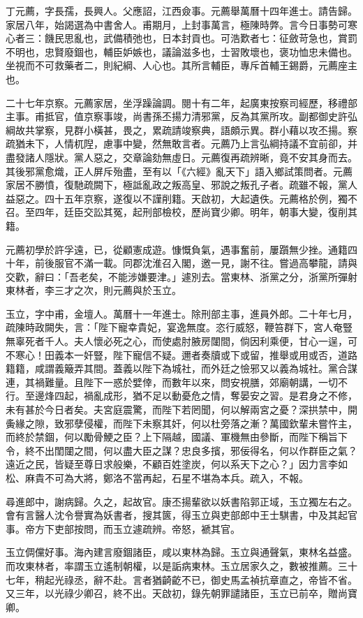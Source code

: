 \begin{pinyinscope}
丁元薦，字長孺，長興人。父應詔，江西僉事。元薦舉萬曆十四年進士。請告歸。家居八年，始謁選為中書舍人。甫期月，上封事萬言，極陳時弊。言今日事勢可寒心者三：饑民思亂也，武備積弛也，日本封貢也。可浩歎者七：征斂苛急也，賞罰不明也，忠賢廢錮也，輔臣妒嫉也，議論滋多也，士習敗壞也，褒功恤忠未備也。坐視而不可救藥者二，則紀綱、人心也。其所言輔臣，專斥首輔王錫爵，元薦座主也。

二十七年京察。元薦家居，坐浮躁論調。閱十有二年，起廣東按察司經歷，移禮部主事。甫抵官，值京察事竣，尚書孫丕揚力清邪黨，反為其黨所攻。副都御史許弘綱故共掌察，見群小橫甚，畏之，累疏請竣察典，語頗示異。群小藉以攻丕揚。察疏猶未下，人情杌隉，慮事中變，然無敢言者。元薦乃上言弘綱持議不宜前卻，并盡發諸人隱狀。黨人惡之，交章論劾無虛日。元薦復再疏辨晰，竟不安其身而去。其後邪黨愈熾，正人屏斥殆盡，至有以「《六經》亂天下」語入鄉試策問者。元薦家居不勝憤，復馳疏闕下，極詆亂政之叛高皇、邪說之叛孔子者。疏雖不報，黨人益惡之。四十五年京察，遂復以不謹削籍。天啟初，大起遺佚。元薦格於例，獨不召。至四年，廷臣交訟其冤，起刑部檢校，歷尚寶少卿。明年，朝事大變，復削其籍。

元薦初學於許孚遠，已，從顧憲成遊。慷慨負氣，遇事奮前，屢躓無少挫。通籍四十年，前後服官不滿一載。同郡沈淮召入閣，邀一見，謝不往。嘗過高攀龍，請與交歡，辭曰：「吾老矣，不能涉嫌要津。」遽別去。當東林、浙黨之分，浙黨所彈射東林者，李三才之次，則元薦與於玉立。

玉立，字中甫，金壇人。萬曆十一年進士。除刑部主事，進員外郎。二十年七月，疏陳時政闕失，言：「陛下寵幸貴妃，宴逸無度。恣行威怒，鞭笞群下，宮人奄豎無辜死者千人。夫人懷必死之心，而使處肘腋房闥間，倘因利乘便，甘心一逞，可不寒心！田義本一奸豎，陛下寵信不疑。邇者奏牘或下或留，推舉或用或否，道路籍籍，咸謂義簸弄其間。蓋義以陛下為城社，而外廷之憸邪又以義為城社。黨合謀連，其禍難量。且陛下一惑於嬖倖，而數年以來，問安視膳，郊廟朝講，一切不行。至邊烽四起，禍亂成形，猶不足以動憂危之情，奪晏安之習。是君身之不修，未有甚於今日者矣。夫宮庭震驚，而陛下若罔聞，何以解兩宮之憂？深拱禁中，開夤緣之隙，致邪孽侵權，而陛下未察其奸，何以杜旁落之漸？萬國欽輩未嘗忤主，而終於禁錮，何以勵骨鯁之臣？上下隔越，國議、軍機無由參斷，而陛下稱旨下令，終不出閨闥之間，何以盡大臣之謀？忠良多擯，邪佞得名，何以作群臣之氣？遠近之民，皆疑至尊日求般樂，不顧百姓塗炭，何以系天下之心？」因力言李如松、麻貴不可為大將，鄭洛不當再起，石星不堪為本兵。疏入，不報。

尋進郎中，謝病歸。久之，起故官。康丕揚輩欲以妖書陷郭正域，玉立獨左右之。會有言醫人沈令譽實為妖書者，搜其篋，得玉立與吏部郎中王士騏書，中及其起官事。帝方下吏部按問，而玉立遽疏辨。帝怒，褫其官。

玉立倜儻好事。海內建言廢錮諸臣，咸以東林為歸。玉立與通聲氣，東林名益盛。而攻東林者，率謂玉立遙制朝權，以是詬病東林。玉立居家久之，數被推薦。三十七年，稍起光祿丞，辭不赴。言者猶齮齕不已，御史馬孟禎抗章直之，帝皆不省。又三年，以光祿少卿召，終不出。天啟初，錄先朝罪譴諸臣，玉立已前卒，贈尚寶卿。


\end{pinyinscope}
